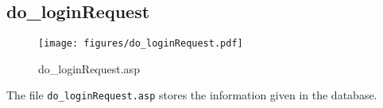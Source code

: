 \subsection{do\_loginRequest}
\begin{figure}[htb]
    \begin{center}
        \texttt{[image: figures/do\_loginRequest.pdf]}
    \end{center}
    \caption{do\_loginRequest.asp}
    \label{fig:do_loginRequest}
\end{figure}

The file \verb|do_loginRequest.asp| stores the information given in the
database.
